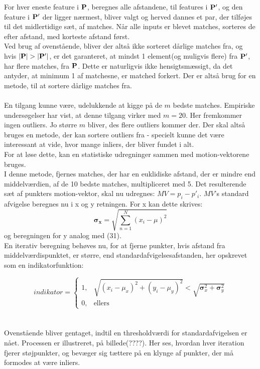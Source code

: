 For hver eneste feature i $\bold{P}$, beregnes alle afstandene, til features i $\bold{P}'$, og den feature i $\bold{P}'$ der ligger nærmest, bliver valgt og herved dannes et par, der tilføjes til det midlertidige sæt, af matches. Når alle inputs er blevet matches, sorteres de efter afstand, med korteste afstand først. 
\\
Ved brug af ovenstående, bliver der altså ikke sorteret dårlige matches fra, og hvis $|\bold{P}| > |\bold{P}'|$, er det garanteret, at mindst 1 element(og muligvis flere) fra $\bold{P}'$, har flere matches, fra $\bold{P}$. Dette er naturligvis ikke hensigtsmæssigt, da det antyder, at minimum 1 af matchesne, er matched forkert. Der er altså brug for en metode, til at sortere dårlige matches fra.
\\
\\
En tilgang kunne være, udelukkende at kigge på de $m$ bedste matches. Empiriske undersøgelser har vist, at denne tilgang virker med $m=20$. Her fremkommer ingen outliers. Jo større $m$ bliver, des flere outliers kommer der. Der skal altså bruges en metode, der kan sortere outliers fra - specielt kunne det være interessant at vide, hvor mange inliers, der bliver fundet i alt.
\\
For at løse dette, kan en statistiske udregninger sammen med motion-vektorene bruges. 
\\
I denne metode, fjernes matches, der har en euklidiske afstand, der er mindre end middelværdien, af de 10 bedste matches, multipliceret med 5. Det resulterende sæt af punkters motion-vektor, skal nu udregnes: $MV = p_i - p'_i$. 
$MV$'s standard afvigelse beregnes nu i x og y retningen. For x kan dette skrives: 
\begin{equation}
\boldsymbol{\sigma_x} = \sqrt{ \sum \limits_{n=1}^N (x_i  - \mu)^2 }
\end{equation}
og beregningen for y analog med (31). \\
En iterativ beregning behøves nu, for at fjerne punkter, hvis afstand fra middelværdispunktet, er større, end standardafvigelsesafstanden, her opskrevet som en indikatorfunktion:



\[
indikator=
\begin{cases}
    1,& \sqrt{(x_i - \mu_x)^2 + (y_i - \mu_y)^2} < \sqrt{\boldsymbol\sigma_x^2 + \boldsymbol\sigma_y^2} \\
    0,& \text{ellers}
    \end{cases}
\]
\\
\\
Ovenstående bliver gentaget, indtil en thresholdværdi for standardafvigelsen er nået. Processen er illustreret, på billede(????). Her ses, hvordan hver iteration fjerer støjpunkter, og bevæger sig tættere på en klynge af punkter, der må formodes at være inliers.